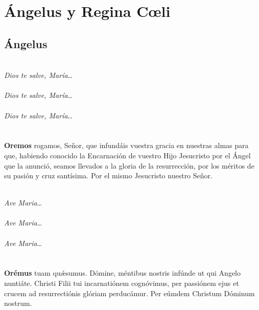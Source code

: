 \documentclass[./L00_main.tex]{subfiles}
\begin{document}
\chapter*{Ángelus y Regina C{\oe}li}

\section*{Ángelus}

\begin{minipage}[t]{0.475\textwidth}
    \\
    \textit{Dios te salve, María}\ldots\\
    \\
    \textit{Dios te salve, María}\ldots\\
    \\
    \textit{Dios te salve, María}\ldots\\
    \ruegapornosotrossalve\\\\
    \textbf{Oremos}
     rogamos, Señor, que infundáis vuestra gracia en nuestras almas para que,
    habiendo conocido la Encarnación de vuestro Hijo Jesucristo por el Ángel que la anunció,
    seamos llevados a la gloria de la resurrección, por los méritos de su pasión y cruz santísima.
    Por el mismo Jesucristo nuestro Señor.\\
\end{minipage}
\begin{minipage}[t]{0.475\textwidth}
    \\
    \textit{Ave Maria}\ldots\\
    \\
    \textit{Ave Maria}\ldots\\
    \\
    \textit{Ave Maria}\ldots\\
    \orapronobissalve\\\\
    \textbf{Orémus}
     tuam qu{\'\ae}sumus. Dómine, méntibus nostris infúnde ut qui Angelo nuntiáte.
    Christi Filii tui incarnatiónem cognóvimus, per passiónem ejus et crucem ad resurrectiónis glóriam perducámur.
    Per eúmdem Christum Dóminum nostrum.\\
\end{minipage}
\end{document}
